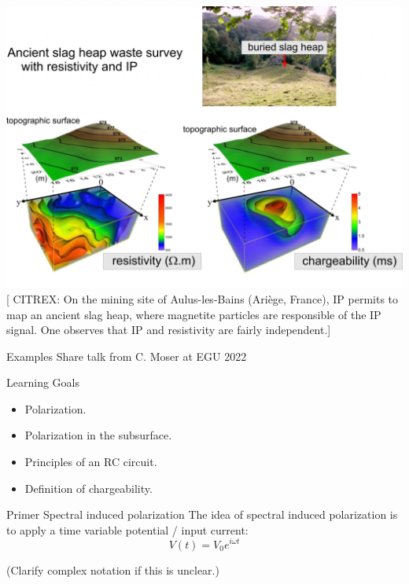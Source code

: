 \begin{frame}
  \includegraphics[width=0.8\linewidth]{Figures/InducedPolarization/IPSlagHeap.jpg}
  \tiny [ CITREX: On the mining site of Aulus-les-Bains (Ariège, France), IP permits to map an ancient slag heap, where magnetite particles are responsible of the IP signal. One observes that IP and resistivity are fairly independent.]
\end{frame}

\begin{frame}{Examples}
   Share talk from C. Moser at EGU 2022
\end{frame}

\begin{frame}
  \begin{PointSix}{Learning Goals}
    \begin{itemize}
      \item \alert{Polarization.}
      \item \alert{Polarization in the subsurface.}
      \item \alert{Principles of an RC circuit.}
      \item \alert{Definition of chargeability.}
    \end{itemize}
  \end{PointSix}
\end{frame}

\begin{frame}
  \begin{PointSix}{Primer Spectral induced polarization}
       \small 
      The idea of spectral induced polarization is to apply a time variable potential / input current:
      $$
        V(t) = V_0e^{i\omega t}
      $$

      (Clarify complex notation if this is unclear.)
  \end{PointSix}
\end{frame}

